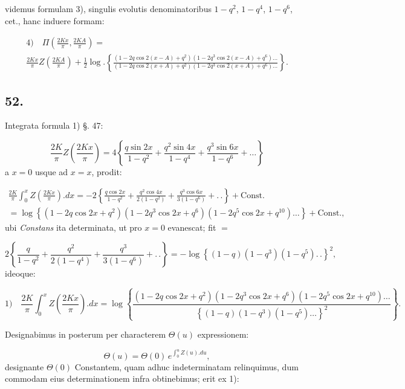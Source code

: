 \documentclass{article}
\begin{document}
videmus formulam 3), singulis evolutis denominatoribus $1-q^{2}$, $1-q^{4}$, $1-q^{6}$, cet., hanc induere formam:

\[
\begin{gathered}
\text{4)}\quad \Pi\left(\frac{2Kx}{\pi},\frac{2KA}{\pi}\right)=\\[1.5ex]
\frac{2Kx}{\pi}Z\left(\frac{2KA}{\pi}\right)+\frac{1}{2}\log.\left\{\frac{\left(1-2q\cos2(x-A)+q^{2}\right)\left(1-2q^{3}\cos2(x-A)+q^{6}\right)\ldots}{\left(1-2q\cos2(x+A)+q^{2}\right)\left(1-2q^{3}\cos2(x+A)+q^{6}\right)\ldots}\right\}.
\end{gathered}
\]

\subsection*{52.}

Integrata formula 1) §. 47:

\[
\frac{2K}{\pi}Z\left(\frac{2Kx}{\pi}\right)=4\left\{\frac{q\sin2x}{1-q^{2}}+\frac{q^{2}\sin4x}{1-q^{4}}+\frac{q^{3}\sin6x}{1-q^{6}}+\ldots\right\}
\]
a $x=0$ usque ad $x=x$, prodit:

\[
\begin{gathered}
\frac{2K}{\pi}\int_{0}^{x}Z\left(\frac{2Kx}{\pi}\right).dx=-2\left\{\frac{q\cos2x}{1-q^{2}}+\frac{q^{2}\cos4x}{2(1-q^{2})}+\frac{q^{3}\cos6x}{3(1-q^{6})}+.\,.\right\}+\text{Const.}\\[1.5ex]
=\log\left\{(1-2q\cos2x+q^{2})(1-2q^{3}\cos2x+q^{6})(1-2q^{5}\cos2x+q^{10})\ldots\right\}+\text{Const.},
\end{gathered}
\]
ubi \emph{Constans} ita determinata, ut pro $x=0$ evanescat; fit $=$

\[
2\left\{\frac{q}{1-q^{2}}+\frac{q^{2}}{2(1-q^{4})}+\frac{q^{3}}{3(1-q^{6})}+.\,.\right\}=-\log\left\{(1-q)(1-q^{3})(1-q^{5}).\,.\right\}^{2},
\]
ideoque:

\[
\text{1)}\quad \frac{2K}{\pi}\int_{0}^{x}Z\left(\frac{2Kx}{\pi}\right).dx=\log\left\{\frac{(1-2q\cos2x+q^{2})(1-2q^{3}\cos2x+q^{6})(1-2q^{5}\cos2x+q^{10})\ldots}{\left\{(1-q)(1-q^{3})(1-q^{5})\ldots\right\}^{2}}\right\}.
\]

Designabimus in posterum per characterem $\Theta(u)$ expressionem:

\[
\Theta(u)=\Theta(0)\,e^{\int_{0}^{u}Z(u).du},
\]
designante $\Theta(0)$ Constantem, quam adhuc indeterminatam relinquimus, dum commodam eius determinationem infra obtinebimus; erit ex 1):
\end{document}
